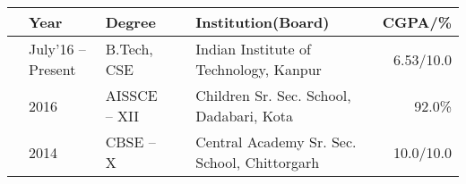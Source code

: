 
\newcommand{\education}[4]{
  & #1 & #2 & &#3 & #4
}
\begin{tabular}{ | L{0.05cm} l | L{3cm} | L{0.05cm} C{8cm} | r |}
  \hline
  \education{\textbf{Year}}{\textbf{Degree}}{\textbf{Institution(Board)}}{\textbf{CGPA/\%}}\\
  \hline
  \education{July'16 -- Present}{B.Tech, CSE}{Indian Institute of Technology, Kanpur}{6.53/10.0}\\
  \education{2016}{AISSCE -- XII}{Children Sr. Sec. School, Dadabari, Kota}{92.0\%}\\
  \education{2014}{CBSE -- X}{Central Academy Sr. Sec. School, Chittorgarh}{10.0/10.0}\\
  \hline
\end{tabular}

